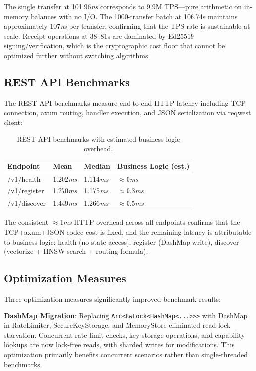 The single transfer at 101.96\textit{ns} corresponds to 9.9M TPS---pure arithmetic on in-memory balances with no I/O. The 1000-transfer batch at 106.74\textmu s maintains approximately 107\textit{ns} per transfer, confirming that the TPS rate is sustainable at scale. Receipt operations at 38--81\textmu s are dominated by Ed25519 signing/verification, which is the cryptographic cost floor that cannot be optimized further without switching algorithms.

\subsection{REST API Benchmarks}

The REST API benchmarks measure end-to-end HTTP latency including TCP connection, axum routing, handler execution, and JSON serialization via reqwest client:

\begin{table}[h]
\centering
\begin{tabular}{@{}llll@{}}
\toprule
Endpoint & Mean & Median & Business Logic (est.) \\
\midrule
/v1/health & 1.202\textit{ms} & 1.114\textit{ms} & $\approx$0\textit{ms} \\
/v1/register & 1.270\textit{ms} & 1.175\textit{ms} & $\approx$0.3\textit{ms} \\
/v1/discover & 1.449\textit{ms} & 1.266\textit{ms} & $\approx$0.5\textit{ms} \\
\bottomrule
\end{tabular}
\caption{REST API benchmarks with estimated business logic overhead.}
\label{tab:api-bench}
\end{table}

The consistent $\approx$1\textit{ms} HTTP overhead across all endpoints confirms that the TCP+axum+JSON codec cost is fixed, and the remaining latency is attributable to business logic: health (no state access), register (DashMap write), discover (vectorize + HNSW search + routing formula).

\subsection{Optimization Measures}

Three optimization measures significantly improved benchmark results:

\textbf{DashMap Migration}: Replacing \texttt{Arc<RwLock<HashMap<...>>>} with DashMap~\cite{dashmap2022} in RateLimiter, SecureKeyStorage, and MemoryStore eliminated read-lock starvation. Concurrent rate limit checks, key storage operations, and capability lookups are now lock-free reads, with sharded writes for modifications. This optimization primarily benefits concurrent scenarios rather than single-threaded benchmarks.

